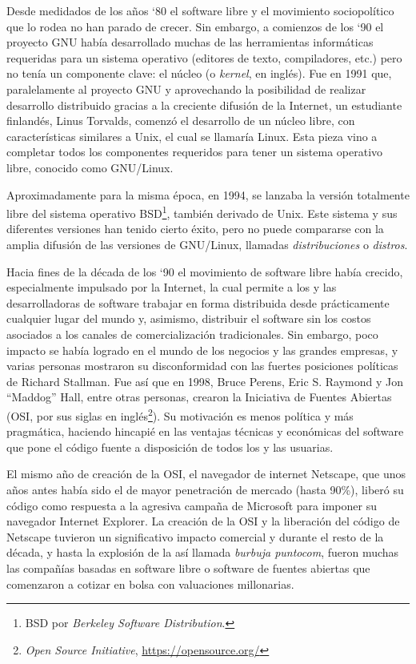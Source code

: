 Desde medidados de los años `80 el software libre y el movimiento sociopolítico que lo rodea no han parado de crecer. Sin embargo, a comienzos de los `90 el proyecto GNU había desarrollado muchas de las herramientas informáticas requeridas para un sistema operativo (editores de texto, compiladores, etc.) pero no tenía un componente clave: el núcleo (o \emph{kernel}, en inglés). Fue en 1991 que, paralelamente al proyecto GNU y aprovechando la posibilidad de realizar desarrollo distribuido gracias a la creciente difusión de la Internet, un estudiante finlandés, Linus Torvalds, comenzó el desarrollo de un núcleo libre, con características similares a Unix, el cual se llamaría Linux. Esta pieza vino a completar todos los componentes requeridos para tener un sistema operativo libre, conocido como GNU/Linux.

Aproximadamente para la misma época, en 1994, se lanzaba la versión totalmente libre del sistema operativo BSD\footnote{BSD por \emph{Berkeley Software Distribution}.}, también derivado de Unix. Este sistema y sus diferentes versiones han tenido cierto éxito, pero no puede compararse con la amplia difusión de las versiones de GNU/Linux, llamadas \emph{distribuciones} o \emph{distros}.

Hacia fines de la década de los `90 el movimiento de software libre había crecido, especialmente impulsado por la Internet, la cual permite a los y las desarrolladoras de software trabajar en forma distribuida desde prácticamente cualquier lugar del mundo y, asimismo, distribuir el software sin los costos asociados a los canales de comercialización tradicionales. Sin embargo, poco impacto se había logrado en el mundo de los negocios y las grandes empresas, y varias personas mostraron su disconformidad con las fuertes posiciones políticas de Richard Stallman. Fue así que en 1998, Bruce Perens, Eric S. Raymond y  Jon ``Maddog'' Hall, entre otras personas, crearon la Iniciativa de Fuentes Abiertas (OSI, por sus siglas en inglés\footnote{\emph{Open Source Initiative}, \url{https://opensource.org/}}). Su motivación es menos política y más pragmática, haciendo hincapié en las ventajas técnicas y económicas del software que pone el código fuente a disposición de todos los y las usuarias.

El mismo año de creación de la OSI, el navegador de internet Netscape, que unos años antes había sido el de mayor penetración de mercado (hasta 90\%), liberó su código como respuesta a la agresiva campaña de Microsoft para imponer su navegador Internet Explorer. La creación de la OSI y la liberación del código de Netscape tuvieron un significativo impacto comercial y durante el resto de la década, y hasta la explosión de la así llamada \emph{burbuja puntocom}, fueron muchas las compañías basadas en software libre o software de fuentes abiertas que comenzaron a cotizar en bolsa con valuaciones millonarias.

